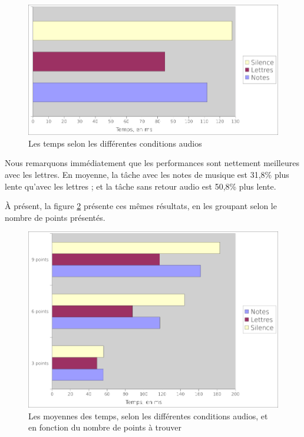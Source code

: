 \documentclass[
]{book}
\begin{document}
\begin{figure}
\centering
\includegraphics{img/res_loc_temps.png}
\caption{\label{fig:resultats}Les temps selon les différentes conditions
audios}
\end{figure}

Nous remarquons immédiatement que les performances sont nettement
meilleures avec les lettres. En moyenne, la tâche avec les notes de musique
est 31,8\% plus lente qu'avec les lettres ; et la tâche sans retour audio est
50,8\% plus lente.

À présent, la figure \ref{fig:moyennes-difficulte} présente ces
mêmes résultats, en les groupant selon le nombre de points présentés.

\begin{figure}
\centering
\includegraphics{img/res_loc_temps_points.png}
\caption{\label{fig:moyennes-difficulte}Les moyennes des
temps, selon les différentes conditions audios, et en fonction du
nombre de points à trouver}
\end{figure}
\end{document}
